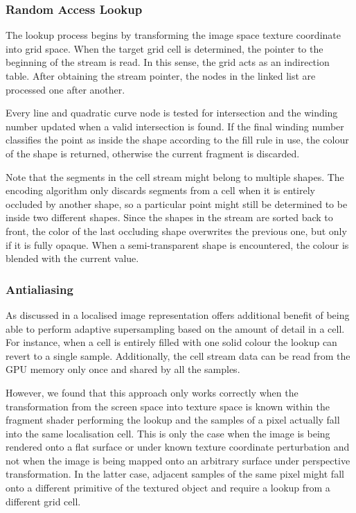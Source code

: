\documentclass[11pt,a4paper,twoside]{article}
\begin{document}
\subsubsection{Random Access Lookup}

The lookup process begins by transforming the image space texture coordinate into grid space. When the target grid cell is determined, the pointer to the beginning of the stream is read. In this sense, the grid acts as an indirection table. After obtaining the stream pointer, the nodes in the linked list are processed one after another.

Every line and quadratic curve node is tested for intersection and the winding number updated when a valid intersection is found. If the final winding number classifies the point as inside the shape according to the fill rule in use, the colour of the shape is returned, otherwise the current fragment is discarded.

Note that the segments in the cell stream might belong to multiple shapes. The encoding algorithm only discards segments from a cell when it is entirely occluded by another shape, so a particular point might still be determined to be inside two different shapes. Since the shapes in the stream are sorted back to front, the color of the last occluding shape overwrites the previous one, but only if it is fully opaque. When a semi-transparent shape is encountered, the colour is blended with the current value.

\subsubsection {Antialiasing}

As discussed in \cite{NehabHoppe08} a localised image representation offers additional benefit of being able to perform adaptive supersampling based on the amount of detail in a cell. For instance, when a cell is entirely filled with one solid colour the lookup can revert to a single sample. Additionally, the cell stream data can be read from the GPU memory only once and shared by all the samples.

However, we found that this approach only works correctly when the transformation from the screen space into texture space is known within the fragment shader performing the lookup and the samples of a pixel actually fall into the same localisation cell. This is only the case when the image is being rendered onto a flat surface or under known texture coordinate perturbation and not when the image is being mapped onto an arbitrary surface under perspective transformation. In the latter case, adjacent samples of the same pixel might fall onto a different primitive of the textured object and require a lookup from a different grid cell.
\end{document}
